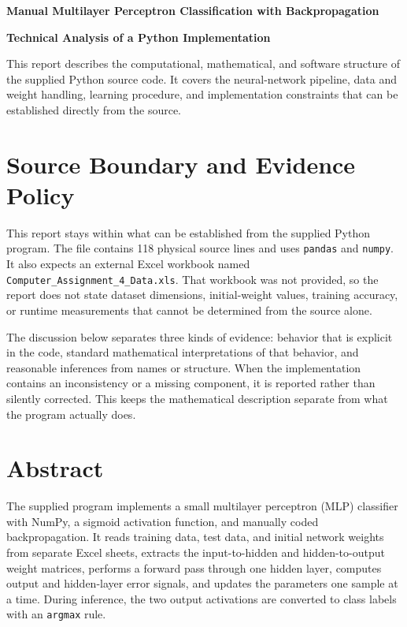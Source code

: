 \documentclass[11pt,a4paper]{article}
\newcommand{\code}[1]{\texttt{\small #1}}
\begin{document}
\begin{titlepage}
\centering
\vspace*{0.18\textheight}
{\Huge\bfseries Manual Multilayer Perceptron Classification with Backpropagation\par}
\vspace{0.7cm}
{\Large\bfseries Technical Analysis of a Python Implementation\par}
\vspace{1.5cm}
\begin{minipage}{0.84\textwidth}
\centering
This report describes the computational, mathematical, and software structure of the supplied Python source code. It covers the neural-network pipeline, data and weight handling, learning procedure, and implementation constraints that can be established directly from the source.
\end{minipage}
\vfill
\end{titlepage}

\tableofcontents
\clearpage

\section*{Source Boundary and Evidence Policy}
This report stays within what can be established from the supplied Python program. The file contains 118 physical source lines and uses \code{pandas} and \code{numpy}. It also expects an external Excel workbook named \code{Computer\_Assignment\_4\_Data.xls}. That workbook was not provided, so the report does not state dataset dimensions, initial-weight values, training accuracy, or runtime measurements that cannot be determined from the source alone.

The discussion below separates three kinds of evidence: behavior that is explicit in the code, standard mathematical interpretations of that behavior, and reasonable inferences from names or structure. When the implementation contains an inconsistency or a missing component, it is reported rather than silently corrected. This keeps the mathematical description separate from what the program actually does.

\section*{Abstract}
The supplied program implements a small multilayer perceptron (MLP) classifier with NumPy, a sigmoid activation function, and manually coded backpropagation. It reads training data, test data, and initial network weights from separate Excel sheets, extracts the input-to-hidden and hidden-to-output weight matrices, performs a forward pass through one hidden layer, computes output and hidden-layer error signals, and updates the parameters one sample at a time. During inference, the two output activations are converted to class labels with an \code{argmax} rule.
\end{document}
